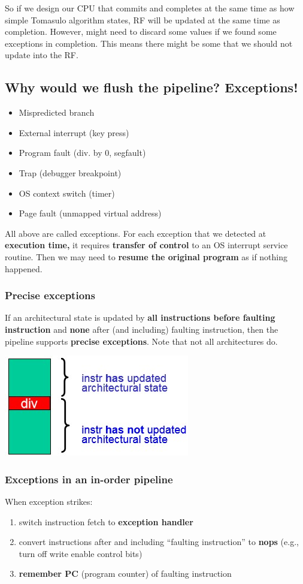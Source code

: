 \documentclass[letterpaper,12pt]{article}
\begin{document}
So if we design our CPU that commits and completes at the same time as how simple Tomasulo algorithm states, RF will be updated at the same time as completion. However, might need to discard some values if we found some exceptions in completion. This means there might be some that we should not update into the RF.

\subsection{Why would we flush the pipeline? Exceptions!}
\begin{itemize}
    \item Mispredicted branch
    \item External interrupt (key press)
    \item Program fault (div. by 0, segfault)
    \item Trap (debugger breakpoint)
    \item OS context switch (timer)
    \item Page fault (unmapped virtual address)
\end{itemize}

All above are called exceptions. For each exception that we detected at \textbf{execution time,} it requires \textbf{transfer of control} to an OS interrupt service routine. Then we may need to \textbf{resume the original program} as if nothing happened.

\subsubsection{Precise exceptions}

If an architectural state is updated by \textbf{all instructions before faulting instruction} and \textbf{none} after (and including) faulting instruction, then the pipeline supports \textbf{precise exceptions}. Note that not all architectures do.

\includegraphics*{Image/precise exception.jpg}

\subsubsection{Exceptions in an in-order pipeline}
When exception strikes:
\begin{enumerate}
    \item switch instruction fetch to \textbf{exception handler}
    \item convert instructions after and including ``faulting instruction'' to \textbf{nops} (e.g., turn off write enable control bits)
    \item \textbf{remember PC} (program counter) of faulting instruction
\end{enumerate}
\end{document}
